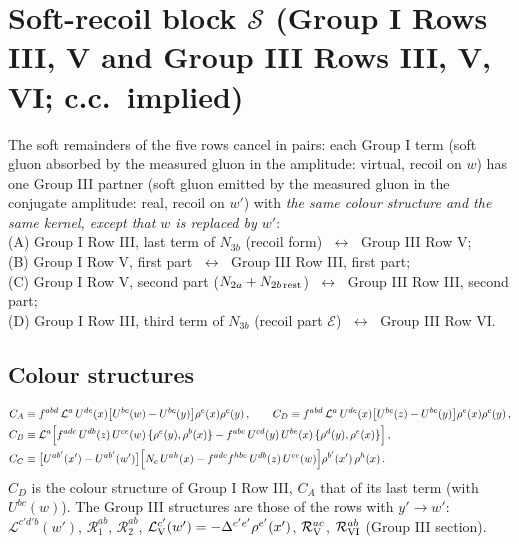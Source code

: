 {\color{red}
\section{Soft-recoil block $\mathcal{S}$ (Group I Rows III, V and Group III Rows III, V, VI; c.c.\ implied)}\label{sec:fx-soft}
 The soft remainders of the five rows cancel in pairs: each Group I term (soft gluon absorbed by the measured gluon in the amplitude: virtual, recoil on $w$) has one Group III partner (soft gluon emitted by the measured gluon in the conjugate amplitude: real, recoil on $w'$) with \emph{the same colour structure and the same kernel, except that $w$ is replaced by $w'$}:\\[2pt]
\hspace*{1em}(A) Group I Row III, last term of $N_{3b}$ (recoil form) $\;\leftrightarrow\;$ Group III Row V;\\
\hspace*{1em}(B) Group I Row V, first part $\;\leftrightarrow\;$ Group III Row III, first part;\\
\hspace*{1em}(C) Group I Row V, second part ($N_{2a}+N_{2b\,\rm rest}$) $\;\leftrightarrow\;$ Group III Row III, second part;\\
\hspace*{1em}(D) Group I Row III, third term of $N_{3b}$ (recoil part $\mathcal{E}$) $\;\leftrightarrow\;$ Group III Row VI.

\subsection*{Colour structures}
\begin{align}
C_{A}&\equiv f^{abd}\,\mathcal{L}^{a}\,U^{de}(x)\big[U^{bc}(w)-U^{bc}(y)\big]\rho^{e}(x)\rho^{c}(y)\,,\qquad
C_{D}\equiv f^{abd}\,\mathcal{L}^{a}\,U^{de}(x)\big[U^{bc}(z)-U^{bc}(y)\big]\rho^{e}(x)\rho^{c}(y)\,,\notag\\
C_{B}&\equiv \mathcal{L}^{a}\Big[f^{adc}\,U^{db}(z)\,U^{ce}(w)\,\{\rho^{e}(y),\rho^{b}(x)\}-f^{abc}\,U^{cd}(y)\,U^{be}(x)\,\{\rho^{d}(y),\rho^{e}(x)\}\Big]\,,\label{eq:fx-col}\\
C_{C}&\equiv\big[U^{ab'}(x')-U^{ab'}(w')\big]\Big[N_{c}\,U^{ah}(x)-f^{adc}f^{hbe}\,U^{db}(z)\,U^{ce}(w)\Big]\rho^{b'}(x')\,\rho^{h}(x)\,.\notag
\end{align}
$C_{D}$ is the colour structure of Group I Row III, $C_{A}$ that of its last term (with $U^{bc}(w)$). The Group III structures are those of the rows with $y'\to w'$: $\mathcal{L}^{c'd'b}(w')$, $\mathcal{R}_{1}^{ab}$, $\mathcal{R}_{2}^{ab}$, $\mathcal{L}_{\rm V}^{c'}(w')=-\Delta^{c'e'}\rho^{e'}(x')$, $\mathcal{R}_{\rm V}^{ac}$, $\mathcal{R}_{\rm VI}^{ab}$ (Group III section).

}
